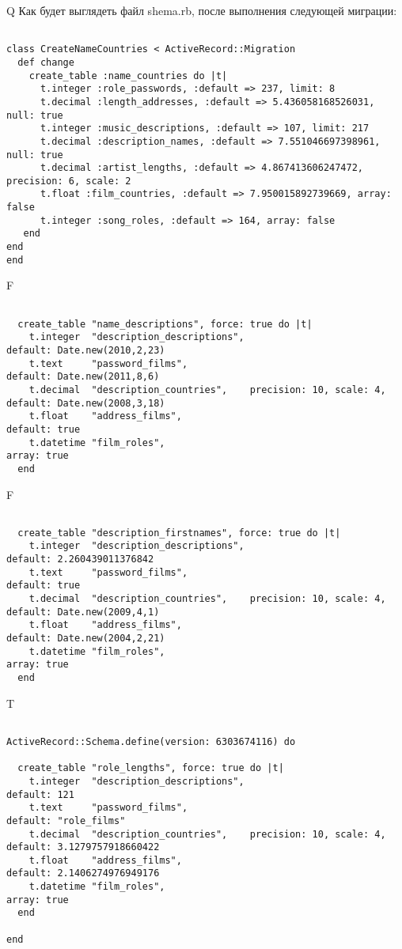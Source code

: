 Q
Как будет выглядеть файл shema.rb, после выполнения следующей миграции:

\begin{verbatim}

class CreateNameCountries < ActiveRecord::Migration 
  def change 
    create_table :name_countries do |t| 
      t.integer :role_passwords, :default => 237, limit: 8
      t.decimal :length_addresses, :default => 5.436058168526031, null: true
      t.integer :music_descriptions, :default => 107, limit: 217
      t.decimal :description_names, :default => 7.551046697398961, null: true
      t.decimal :artist_lengths, :default => 4.867413606247472, precision: 6, scale: 2
      t.float :film_countries, :default => 7.950015892739669, array: false
      t.integer :song_roles, :default => 164, array: false
   end
end
end
\end{verbatim}

F
\begin{verbatim}

  create_table "name_descriptions", force: true do |t|
    t.integer  "description_descriptions",                          default: Date.new(2010,2,23)
    t.text     "password_films",                                    default: Date.new(2011,8,6)
    t.decimal  "description_countries",    precision: 10, scale: 4, default: Date.new(2008,3,18)
    t.float    "address_films",                                     default: true
    t.datetime "film_roles",                                                                     array: true
  end

\end{verbatim}

F
\begin{verbatim}

  create_table "description_firstnames", force: true do |t|
    t.integer  "description_descriptions",                          default: 2.260439011376842
    t.text     "password_films",                                    default: true
    t.decimal  "description_countries",    precision: 10, scale: 4, default: Date.new(2009,4,1)
    t.float    "address_films",                                     default: Date.new(2004,2,21)
    t.datetime "film_roles",                                                                     array: true
  end

\end{verbatim}

T
\begin{verbatim}

ActiveRecord::Schema.define(version: 6303674116) do

  create_table "role_lengths", force: true do |t|
    t.integer  "description_descriptions",                          default: 121
    t.text     "password_films",                                    default: "role_films"
    t.decimal  "description_countries",    precision: 10, scale: 4, default: 3.1279757918660422
    t.float    "address_films",                                     default: 2.1406274976949176
    t.datetime "film_roles",                                                                     array: true
  end

end
\end{verbatim}


